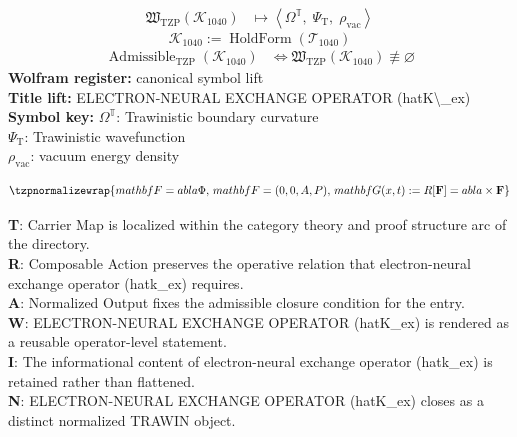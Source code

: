 \noindent
\begin{minipage}[t]{0.48\linewidth}
\begingroup
\small
\[
\begin{aligned}
\mathfrak{W}_{\mathrm{TZP}}\!\left(\mathcal{K}_{1040}\right)
&\longmapsto
\left\langle \Omega^{\mathbb{T}},\; \Psi_{\mathrm{T}},\; \rho_{\mathrm{vac}} \right\rangle
\end{aligned}
\]
\[
\mathcal{K}_{1040}
:=
\operatorname{HoldForm}\!\left(\mathcal{T}_{1040}\right)
\]
\[
\begin{aligned}
\operatorname{Admissible}_{\mathrm{TZP}}\!\left(\mathcal{K}_{1040}\right)
&\Longleftrightarrow
\mathfrak{W}_{\mathrm{TZP}}\!\left(\mathcal{K}_{1040}\right)\not\equiv\varnothing
\end{aligned}
\]
\textbf{Wolfram register:} canonical symbol lift\\
\textbf{Title lift:} ELECTRON-NEURAL EXCHANGE OPERATOR (hatK\textbackslash{}\_ex)\\
\textbf{Symbol key:} \(\Omega^{\mathbb{T}}\): Trawinistic boundary curvature\\ \(\Psi_{\mathrm{T}}\): Trawinistic wavefunction\\ \(\rho_{\mathrm{vac}}\): vacuum energy density
\par
\endgroup
\end{minipage}\hfill
\begin{minipage}[t]{0.48\linewidth}
\[
\tzpnormalizewrap{mathbf{F} =  abla\Phi,\,mathbf{F} = (0,0,A,P),\,mathbf{G}(x,t) := R[\mathbf{F}] =  abla\times \mathbf{F}}
\]

\small
\textbf{T}: Carrier Map is localized within the category theory and proof structure arc of the directory.\\
\textbf{R}: Composable Action preserves the operative relation that electron-neural exchange operator (hatk\_ex) requires.\\
\textbf{A}: Normalized Output fixes the admissible closure condition for the entry.\\
\textbf{W}: ELECTRON-NEURAL EXCHANGE OPERATOR (hatK\_ex) is rendered as a reusable operator-level statement.\\
\textbf{I}: The informational content of electron-neural exchange operator (hatk\_ex) is retained rather than flattened.\\
\textbf{N}: ELECTRON-NEURAL EXCHANGE OPERATOR (hatK\_ex) closes as a distinct normalized TRAWIN object.
\normalsize
\end{minipage}

